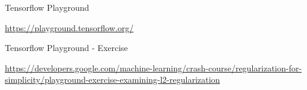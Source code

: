 \begin{frame}{Tensorflow Playground}
\begin{figure}
\centering
{}
  \end{figure}
  \scriptsize
  \url{https://playground.tensorflow.org/}
\end{frame}

\begin{frame}{Tensorflow Playground - Exercise}
  \begin{figure}
    \centering
  \end{figure}
  \scriptsize
  \url{https://developers.google.com/machine-learning/crash-course/regularization-for-simplicity/playground-exercise-examining-l2-regularization}
\end{frame}


\endlecture
